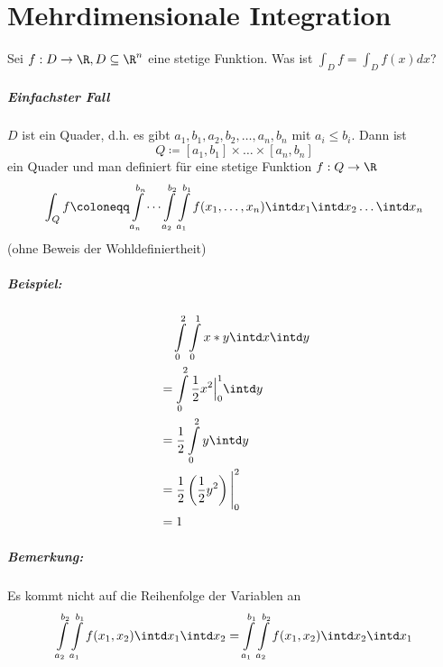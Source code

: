 \chapter{Mehrdimensionale Integration}
Sei $f:D\rightarrow\R, D\subseteq \R^n$ eine stetige Funktion. Was ist $\int_D f=\int_D f(x)dx$?

\paragraph{Einfachster Fall}
$D$ ist ein Quader, d.h. es gibt $a_1,b_1,a_2,b_2,\ldots,a_n,b_n$ mit $a_i\leq b_i$. Dann ist
\begin{equation*}
	Q\coloneqq [a_1,b_1]\times \ldots\times [a_n,b_n]
\end{equation*}
ein Quader und man definiert für eine stetige Funktion $f:Q\rightarrow\R$
\begin{equation*}
	\int_Q f\coloneqq \int\limits_{a_n}^{b_n}\cdots\int\limits_{a_2}^{b_2}\int\limits_{a_1}^{b_1} f(x_1,\ldots,x_n)\intd x_1\intd x_2\ldots \intd x_n
\end{equation*}
(ohne Beweis der Wohldefiniertheit)

\paragraph{Beispiel:}
\begin{align*}
	&\quad\int\limits_0^2\int\limits_0^1 x*y\intd x \intd y\\
	&=\int\limits_0^2 \frac 12 x^2\Big|_0^1\intd y\\
	&=\frac 12 \int\limits_0^2 y\intd y\\
	&=\frac 12 \left(\frac12 y^2\right)\Bigg|_0^2\\
	&=1
\end{align*}

\paragraph{Bemerkung:}
Es kommt nicht auf die Reihenfolge der Variablen an
\begin{equation*}
	\int\limits_{a_2}^{b_2}\int\limits_{a_1}^{b_1} f(x_1,x_2)\intd x_1\intd x_2
	=\int\limits_{a_1}^{b_1}\int\limits_{a_2}^{b_2} f(x_1,x_2)\intd x_2\intd x_1
\end{equation*}

